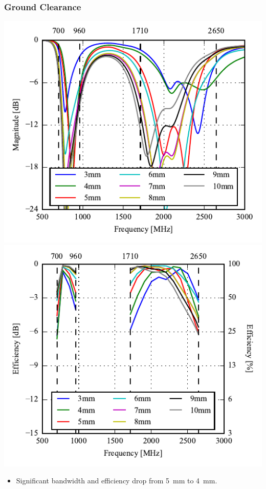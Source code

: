 \begin{frame}
  \frametitle{Ground Clearance}
    \begin{center}
      \includegraphics[scale=0.7]{img/Lasse/s11_5mm.pdf}
\includegraphics[scale=0.7]{img/Lasse/eff_5mm.pdf}
    \end{center}
      \begin{itemize}
      \item Significant bandwidth and efficiency drop from \SI{5}{mm} to \SI{4}{mm}.
      \end{itemize}
\end{frame}

